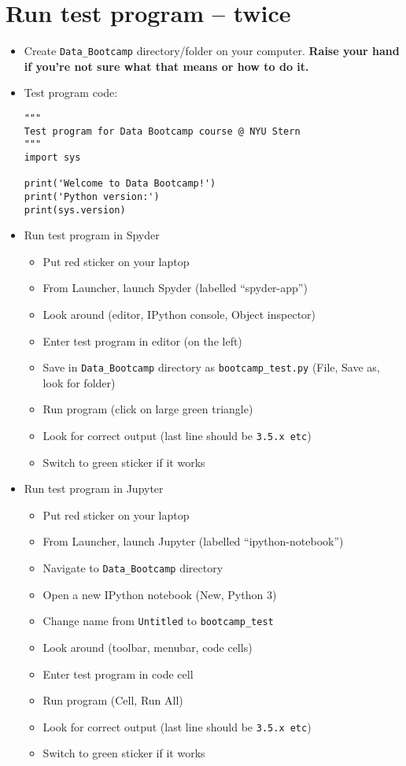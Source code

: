 \documentclass[11pt]{article}
\begin{document}
\section*{Run test program -- twice}

\begin{itemize}
\item Create \verb|Data_Bootcamp| directory/folder on your computer.
{\bf Raise your hand if you're not sure what that means or how to do it.}

\item Test program code:

\vspace{-0.1in}
\begin{verbatim}
"""
Test program for Data Bootcamp course @ NYU Stern
"""
import sys

print('Welcome to Data Bootcamp!')
print('Python version:')
print(sys.version)
\end{verbatim}

\item Run test program in Spyder
\begin{itemize}
\item Put red sticker on your laptop
\item From Launcher, launch Spyder (labelled ``spyder-app'')
\item Look around (editor, IPython console, Object inspector)
\item Enter test program in editor (on the left)
\item Save in \verb|Data_Bootcamp| directory as \verb|bootcamp_test.py|
(File, Save as, look for folder)
\item Run program (click on large green triangle)
\item Look for correct output (last line should be {\tt 3.5.x etc})
\item Switch to green sticker if it works
\end{itemize}

\item Run test program in Jupyter
\begin{itemize}
\item Put red sticker on your laptop
\item From Launcher, launch Jupyter (labelled ``ipython-notebook'')
\item Navigate to \verb|Data_Bootcamp| directory
\item Open a new IPython notebook (New, Python 3)
\item Change name from {\tt Untitled} to \verb|bootcamp_test|
\item Look around (toolbar, menubar, code cells)
\item Enter test program in code cell
\item Run program (Cell, Run All)
\item Look for correct output (last line should be {\tt 3.5.x etc})
\item Switch to green sticker if it works
\end{itemize}


\end{itemize}
\end{document}
